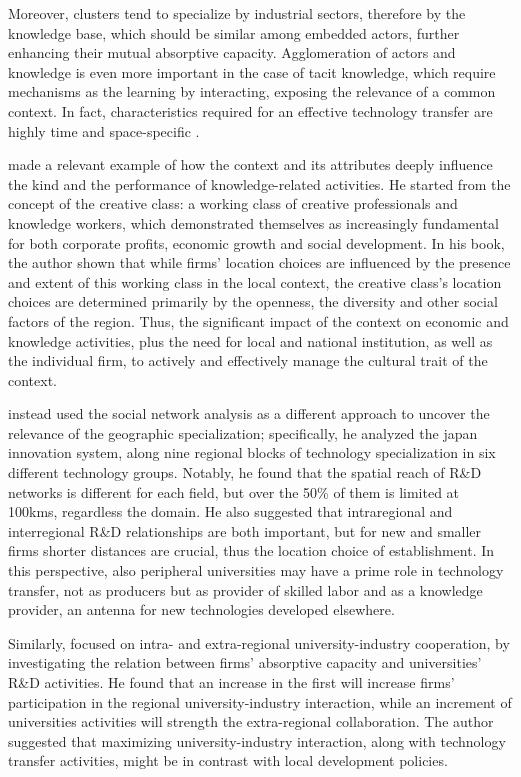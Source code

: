 Moreover, clusters tend to specialize by industrial sectors, therefore by the knowledge base, which should be similar among embedded actors, further enhancing their mutual absorptive capacity. Agglomeration of actors and knowledge is even more important in the case of tacit knowledge, which require mechanisms as the learning by interacting, exposing the relevance of a common context. In fact, characteristics required for an effective technology transfer are highly time and space-specific \citep{Asheim2009}.

\citet{Florida2002} made a relevant example of how the context and its attributes deeply influence the kind and the performance of knowledge-related activities. He started from the concept of the creative class: a working class of creative professionals and knowledge workers, which demonstrated themselves as increasingly fundamental for both corporate profits, economic growth and social development. In his book, the author shown that while firms' location choices are influenced by the presence and extent of this working class in the local context, the creative class's location choices are determined primarily by the openness, the diversity and other social factors of the region. Thus, the significant impact of the context on economic and knowledge activities, plus the need for local and national institution, as well as the individual firm, to actively and effectively manage the cultural trait of the context. 

\citet{Yokura2013} instead used the social network analysis as a different approach to uncover the relevance of the geographic specialization; specifically, he analyzed the japan innovation system, along nine regional blocks of technology specialization in six different technology groups. Notably, he found that the spatial reach of R\&D networks is different for each field, but over the 50\% of them is limited at 100kms, regardless the domain. He also suggested that intraregional and interregional R\&D relationships are both important, but for new and smaller firms shorter distances are crucial, thus the location choice of establishment. In this perspective, also peripheral universities may have a prime role in technology transfer, not as producers but as provider of skilled labor and as a knowledge provider, an antenna for new technologies developed elsewhere.

Similarly, \citet{AzagraCaro2010} focused on intra- and extra-regional university-industry cooperation, by investigating the relation between firms' absorptive capacity and universities' R\&D activities. He found that an increase in the first will increase firms' participation in the regional university-industry interaction, while an increment of universities activities will strength the extra-regional collaboration. The author suggested that maximizing university-industry interaction, along with technology transfer activities, might be in contrast with local development policies.

